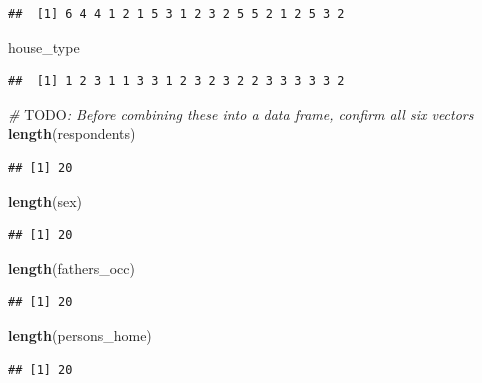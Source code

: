\documentclass[
]{article}
\newenvironment{Shaded}{\begin{snugshade}}{\end{snugshade}}
\newcommand{\AlertTok}[1]{\textcolor[rgb]{0.94,0.16,0.16}{#1}}
\newcommand{\CommentTok}[1]{\textcolor[rgb]{0.56,0.35,0.01}{\textit{#1}}}
\newcommand{\FunctionTok}[1]{\textcolor[rgb]{0.13,0.29,0.53}{\textbf{#1}}}
\newcommand{\NormalTok}[1]{#1}
\begin{document}
\begin{verbatim}
##  [1] 6 4 4 1 2 1 5 3 1 2 3 2 5 5 2 1 2 5 3 2
\end{verbatim}

\begin{Shaded}
\begin{Highlighting}[]
\NormalTok{house\_type}
\end{Highlighting}
\end{Shaded}

\begin{verbatim}
##  [1] 1 2 3 1 1 3 3 1 2 3 2 3 2 2 3 3 3 3 3 2
\end{verbatim}

\begin{Shaded}
\begin{Highlighting}[]
\CommentTok{\# }\AlertTok{TODO}\CommentTok{: Before combining these into a data frame, confirm all six vectors}
\FunctionTok{length}\NormalTok{(respondents)}
\end{Highlighting}
\end{Shaded}

\begin{verbatim}
## [1] 20
\end{verbatim}

\begin{Shaded}
\begin{Highlighting}[]
\FunctionTok{length}\NormalTok{(sex)}
\end{Highlighting}
\end{Shaded}

\begin{verbatim}
## [1] 20
\end{verbatim}

\begin{Shaded}
\begin{Highlighting}[]
\FunctionTok{length}\NormalTok{(fathers\_occ)}
\end{Highlighting}
\end{Shaded}

\begin{verbatim}
## [1] 20
\end{verbatim}

\begin{Shaded}
\begin{Highlighting}[]
\FunctionTok{length}\NormalTok{(persons\_home)}
\end{Highlighting}
\end{Shaded}

\begin{verbatim}
## [1] 20
\end{verbatim}
\end{document}
